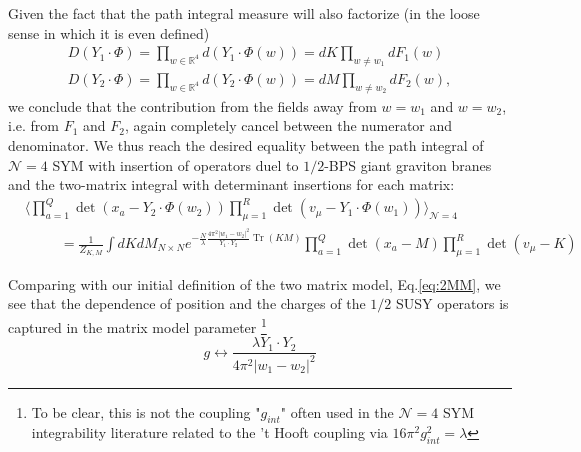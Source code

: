 \documentclass[english]{article}
\DeclareMathOperator{\Tr}{Tr}
\newcommand\be{\begin{equation}}
\newcommand\ee{\end{equation}}
\renewcommand{\>}{\rangle}
\newcommand{\<}{\langle}
\renewcommand{\(}{\left(}
\renewcommand{\)}{\right)}
\begin{document}
Given the fact that the path integral measure will also factorize (in the loose sense in which it is even defined)
\begin{align}
    D \left( Y_{1}\cdot\Phi \right) = \prod_{w \in \mathbb{R}^{4}} d(Y_{1}\cdot\Phi(w)) = dK \prod_{w \neq w_1} dF_{1}(w)  \\
      D \left( Y_{2}\cdot\Phi \right) = \prod_{w \in \mathbb{R}^{4}} d(Y_{2}\cdot\Phi(w)) = dM \prod_{w \neq w_2}  dF_{2}(w), 
\end{align} 
we conclude that the contribution from the fields away from $w=w_1$ and $w=w_2$, i.e. from $F_1$ and $F_{2}$, again completely cancel between the numerator and denominator. We thus reach the desired equality between the path integral of $\mathcal{N}=4$ SYM with insertion of operators duel to $1/2$-BPS giant graviton branes and the two-matrix integral with determinant insertions for each matrix:
\begin{align} \label{eq:generatingfunc}
    &\langle \prod_{a=1}^{Q} \det \left( x_{a}-Y_2 \cdot \Phi(w_{2}) \right) \prod_{\mu=1}^{R} \det\left(v_{\mu}-Y_1 \cdot \Phi(w_{1}) \right) \rangle_{\mathcal{N}=4} \\ \nonumber
    &\hspace{30pt}=  \frac{1}{Z_{K,M}}\int dK dM_{N \times N} e^{-\frac{N}{\lambda} \frac{4 \pi^2 |w_1 -w_{2}|^2}{Y_{1}\cdot Y_{2}} \Tr \left( K M\right)} \prod_{a=1}^{Q} \det \left( x_{a}-M \right) \prod_{\mu=1}^{R} \det\left(v_{\mu}-K \right)
\end{align}

Comparing with our initial definition of the two matrix model, Eq.\ref{eq:2MM}, we see that the dependence of position and the charges of the $1/2$ SUSY operators is captured in the matrix model parameter \footnote{To be clear, this is not the coupling "$g_{int}$" often used in the $\mathcal{N}=4$ SYM integrability literature related to the 't Hooft coupling via $16 \pi^2 g_{int}^2  = \lambda $} 
\be \label{eq:gVSprops}
g \leftrightarrow \frac{\lambda Y_1\cdot Y_2}{4\pi^2|w_1 - w_2|^2}
\ee 
\end{document}
